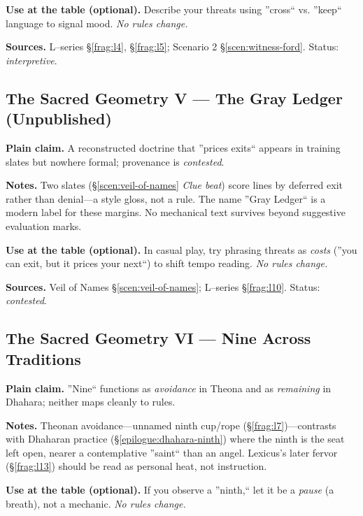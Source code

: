 \documentclass[11pt]{article}
\numberwithin{equation}{section} %
\theoremstyle{plain} %
\theoremstyle{definition} %
\theoremstyle{remark} %
\begin{document}
\medskip
\noindent\textbf{Use at the table (optional).} Describe your threats using ''cross`` vs. ''keep`` language to signal mood. \emph{No rules change.}

\medskip
\noindent\textbf{Sources.} L--series \S\ref{frag:l4}, \S\ref{frag:l5}; Scenario 2 \S\ref{scen:witness-ford}. Status: \emph{interpretive}.

\subsection{The Sacred Geometry V --- The Gray Ledger (Unpublished)}
\label{geometry:gray-ledger}

\noindent\textbf{Plain claim.} A reconstructed doctrine that ''prices exits`` appears in training slates but nowhere formal; provenance is \emph{contested}.

\medskip
\noindent\textbf{Notes.} Two slates (\S\ref{scen:veil-of-names} \emph{Clue beat}) score lines by deferred exit rather than denial---a style gloss, not a rule. The name ''Gray Ledger`` is a modern label for these margins. No mechanical text survives beyond suggestive evaluation marks.

\medskip
\noindent\textbf{Use at the table (optional).} In casual play, try phrasing threats as \emph{costs} (''you can exit, but it prices your next``) to shift tempo reading. \emph{No rules change.}

\medskip
\noindent\textbf{Sources.} Veil of Names \S\ref{scen:veil-of-names}; L--series \S\ref{frag:l10}. Status: \emph{contested}.

\subsection{The Sacred Geometry VI --- Nine Across Traditions}
\label{geometry:nine}

\noindent\textbf{Plain claim.} ''Nine`` functions as \emph{avoidance} in Theona and as \emph{remaining} in Dhahara; neither maps cleanly to rules.

\medskip
\noindent\textbf{Notes.} Theonan avoidance---unnamed ninth cup/rope (\S\ref{frag:l7})---contrasts with Dhaharan practice (\S\ref{epilogue:dhahara-ninth}) where the ninth is the seat left open, nearer a contemplative ''saint`` than an angel. Lexicus's later fervor (\S\ref{frag:l13}) should be read as personal heat, not instruction.

\medskip
\noindent\textbf{Use at the table (optional).} If you observe a ''ninth,`` let it be a \emph{pause} (a breath), not a mechanic. \emph{No rules change.}
\end{document}
